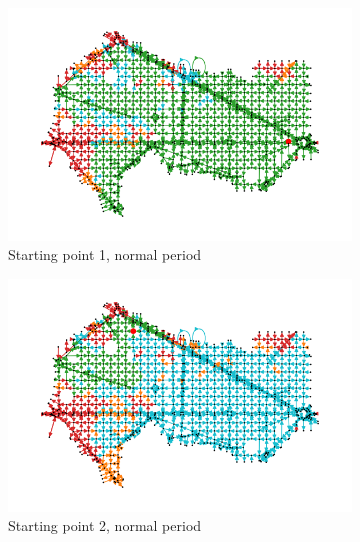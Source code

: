 \begin{figure}[hbt!]
\centering
\begin{subfigure}[t]{0.3\linewidth}
    \centering
    \includegraphics[width=\linewidth]{images/reachable/first_normal_1.png}
    \caption{Starting point 1, normal period}
    \label{fig: first normal reachable}
\end{subfigure}
\begin{subfigure}[t]{0.3\linewidth}
    \centering
    \includegraphics[width=\linewidth]{images/reachable/second_normal_1.png}
    \caption{Starting point 2, normal period}
    \label{fig: second normal reachable}
\end{subfigure}
\begin{subfigure}[t]{0.3\linewidth}
    \centering

\end{subfigure}
\end{figure}
